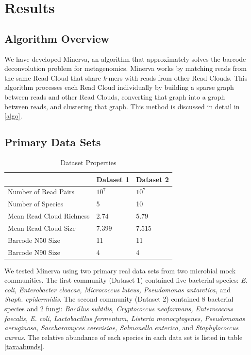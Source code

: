 \section*{Results}

\subsection*{Algorithm Overview}

We have developed Minerva, an algorithm that approximately solves the barcode deconvolution problem for metagenomics. Minerva works by matching reads from the same Read Cloud that share \textit{k}-mers with reads from other Read Clouds. This algorithm processes each Read Cloud individually by building a sparse graph between reads and other Read Clouds, converting that graph into a graph between reads, and clustering that graph. This method is discussed in detail in \ref{algo}.

\subsection*{Primary Data Sets}

\begin{table}[]
\centering
\caption{Dataset Properties}
\label{datasets}
\begin{tabular}{|l || l|l|}
\hline
                     & Dataset 1 & Dataset 2 \\ \hline \hline
Number of Read Pairs & $10^7$ & $10^7$ \\
Number of Species    & 5         & 10        \\
Mean Read Cloud Richness& 2.74      & 5.79      \\
Mean Read Cloud Size    & 7.399     & 7.515     \\
Barcode N50 Size 	 & 11        & 11        \\
Barcode N90 Size	 & 4         & 4         \\ \hline
\end{tabular}
\end{table}

We tested Minerva using two primary real data sets from two microbial mock communities. The first community (Dataset 1) contained five bacterial species: \textit{E. coli, Enterobacter cloacae, Micrococcus luteus, Pseudomonas antarctica}, and \textit{Staph. epidermidis}. The second community (Dataset 2) contained 8 bacterial species and 2 fungi: \textit{Bacillus subtilis, Cryptococcus neoformans, Enterococcus faecalis, E. coli, Lactobacillus fermentum, Listeria monocytogenes, Pseudomonas aeruginosa, Saccharomyces cerevisiae, Salmonella enterica}, and \textit{Staphylococcus aureus}. The relative abundance of each species in each data set is listed in table \ref{taxaabunds}.

